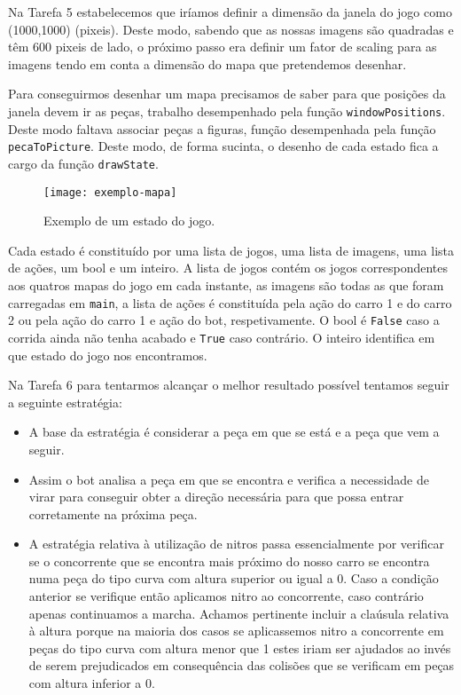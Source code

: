 Na Tarefa 5 estabelecemos que iríamos definir a dimensão da janela do jogo como
(1000,1000) (pixeis). Deste modo, sabendo que as nossas imagens são quadradas e
têm 600 pixeis de lado, o próximo passo era definir um fator de scaling para as
imagens tendo em conta a dimensão do mapa que pretendemos desenhar.

Para conseguirmos desenhar um mapa precisamos de saber para que posições da
janela devem ir as peças, trabalho desempenhado pela função
\texttt{windowPositions}. Deste modo faltava associar peças a figuras, função
desempenhada pela função \texttt{pecaToPicture}. Deste modo, de forma sucinta, o
desenho de cada estado fica a cargo da função \texttt{drawState}.

\begin{figure}[h]
\label{fig:estado}
\centering
\texttt{[image: exemplo-mapa]}
\caption{Exemplo de um estado do jogo.}
\end{figure}

Cada estado é constituído por uma lista de jogos, uma lista de imagens, uma
lista de ações, um bool e um inteiro. A lista de jogos contém os jogos
correspondentes aos quatros mapas do jogo em cada instante, as imagens são todas
as que foram carregadas em \texttt{main}, a lista de ações é constituída pela ação do
carro 1 e do carro 2 ou pela ação do carro 1 e ação do bot,
respetivamente. O bool é \texttt{False} caso a corrida ainda não tenha acabado e
\texttt{True} caso contrário. O inteiro identifica em que estado do jogo nos
encontramos.


Na Tarefa 6 para tentarmos alcançar o melhor resultado possível tentamos seguir
a seguinte estratégia:

\begin{itemize}
\item
  A base da estratégia é considerar a peça em que se está e a peça que
  vem a seguir.
\item
  Assim o bot analisa a peça em que se encontra e verifica a necessidade
  de virar para conseguir obter a direção necessária para que possa
  entrar corretamente na próxima peça.
\item
  A estratégia relativa à utilização de nitros passa essencialmente por
  verificar se o concorrente que se encontra mais próximo do nosso carro
  se encontra numa peça do tipo curva com altura superior ou igual a 0.
  Caso a condição anterior se verifique então aplicamos nitro ao
  concorrente, caso contrário apenas continuamos a marcha. Achamos
  pertinente incluir a claúsula relativa à altura porque na maioria dos
  casos se aplicassemos nitro a concorrente em peças do tipo curva com
  altura menor que 1 estes iriam ser ajudados ao invés de serem
  prejudicados em consequência das colisões que se verificam em peças
  com altura inferior a 0.
\end{itemize}
